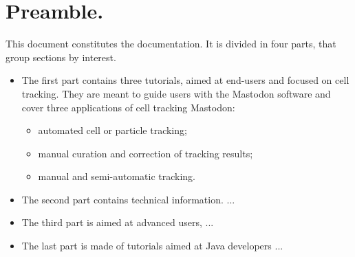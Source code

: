 \section*{Preamble.}

This document constitutes the  documentation. 
It is divided in four parts, that group sections by interest.
\begin{itemize}
	
	\item The first part contains three tutorials, aimed at end-users and focused on cell tracking.
	They are meant to guide users with the Mastodon software and cover three applications of cell tracking Mastodon:
	\begin{itemize}
		\item automated cell or particle tracking;
		\item manual curation and correction of tracking results;
		\item manual and semi-automatic tracking.
	\end{itemize}
	
	\item The second part contains technical information. ...
	
	\item The third part is aimed at advanced users, ...
	
	\item The last part is made of tutorials aimed at Java developers ...
	
\end{itemize}
